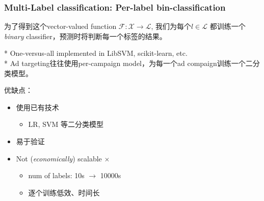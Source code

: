 \documentclass{beamer}
\begin{document}
\begin{frame}
\frametitle{Multi-Label classification: Per-label bin-classification}

为了得到这个vector-valued function $\mathcal{F} : \mathcal{X} \rightarrow \mathcal{L}$, 我们为每个$\mathit{l} \in \mathcal{L}$ 都训练一个\textit{binary} classifier，预测时将判断每一个标签的结果。

* {\small \color{gray} One-versus-all implemented in LibSVM, scikit-learn, etc.} \\
* {\small \color{gray} Ad targeting往往使用per-campaign model，为每一个ad compaign训练一个二分类模型。}
\pause

优缺点：
\begin{itemize}
\item 使用已有技术 {  \color{green} \checkmark}
  \begin{itemize}
  \item LR, SVM 等二分类模型
  \end{itemize}
\item 易于验证 {  \color{green} \checkmark}
\item Not (\textit{economically}) scalable  {  \color{red} $\times$}
  \begin{itemize}
  \item num of labels: 10s $\rightarrow$ 10000s 
  \item 逐个训练低效、时间长
  \end{itemize}
\end{itemize}
\end{frame}
\end{document}
